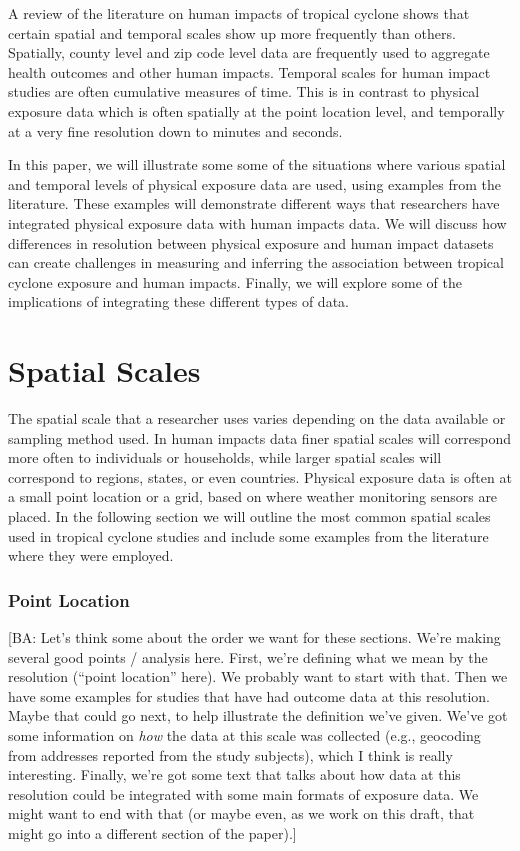 \documentclass[]{article}
\begin{document}
A review of the literature on human impacts of tropical cyclone shows
that certain spatial and temporal scales show up more frequently than
others. Spatially, county level and zip code level data are frequently
used to aggregate health outcomes and other human impacts. Temporal
scales for human impact studies are often cumulative measures of time.
This is in contrast to physical exposure data which is often spatially
at the point location level, and temporally at a very fine resolution
down to minutes and seconds.

In this paper, we will illustrate some some of the situations where
various spatial and temporal levels of physical exposure data are used,
using examples from the literature. These examples will demonstrate
different ways that researchers have integrated physical exposure data
with human impacts data. We will discuss how differences in resolution
between physical exposure and human impact datasets can create
challenges in measuring and inferring the association between tropical
cyclone exposure and human impacts. Finally, we will explore some of the
implications of integrating these different types of data.

\section{Spatial Scales}\label{spatial-scales}

The spatial scale that a researcher uses varies depending on the data
available or sampling method used. In human impacts data finer spatial
scales will correspond more often to individuals or households, while
larger spatial scales will correspond to regions, states, or even
countries. Physical exposure data is often at a small point location or
a grid, based on where weather monitoring sensors are placed. In the
following section we will outline the most common spatial scales used in
tropical cyclone studies and include some examples from the literature
where they were employed.

\subsubsection{Point Location}\label{point-location}

{[}BA: Let's think some about the order we want for these sections.
We're making several good points / analysis here. First, we're defining
what we mean by the resolution (``point location'' here). We probably
want to start with that. Then we have some examples for studies that
have had outcome data at this resolution. Maybe that could go next, to
help illustrate the definition we've given. We've got some information
on \emph{how} the data at this scale was collected (e.g., geocoding from
addresses reported from the study subjects), which I think is really
interesting. Finally, we're got some text that talks about how data at
this resolution could be integrated with some main formats of exposure
data. We might want to end with that (or maybe even, as we work on this
draft, that might go into a different section of the paper).{]}
\end{document}
